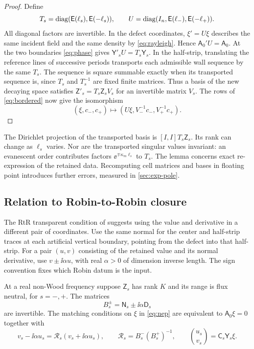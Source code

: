 \begin{proof}
Define
\[
 T_s=\operatorname{diag}(\mathsf E(\ell_s),\mathsf E(-\ell_s)),\qquad
 U=\operatorname{diag}(I_n,\mathsf E(\ell_-),\mathsf E(-\ell_+)).
\]
All diagonal factors are invertible. In the defect coordinates,
$\xi'=U\xi$ describes the same incident field and the same density by
\eqref{eq:rayleigh}. Hence $\mathsf A_0'U=\mathsf A_0$. At the two
boundaries \eqref{eq:phase} gives $\mathsf Y'_sU=T_s\mathsf Y_s$.
In the half-strip, translating the reference lines of successive periods
transports each admissible wall sequence by the same $T_s$. The sequence
is square summable exactly when its transported sequence is, since $T_s$
and $T_s^{-1}$ are fixed finite matrices. Thus a basis of the new
decaying space satisfies $\mathsf Z'_s=T_s\mathsf Z_sV_s$ for an invertible
matrix $V_s$. The rows of \eqref{eq:bordered} now give the isomorphism
\[
 (\xi,c_-,c_+)\longmapsto(U\xi,V_-^{-1}c_-,V_+^{-1}c_+).
\]
\end{proof}

The Dirichlet projection of the transported basis is $[I,I]T_s\mathsf Z_s$.
Its rank can change as $\ell_s$ varies. Nor are the transported singular
values invariant: an evanescent order contributes factors
$\ee^{\mp\kappa_m\ell_s}$ to $T_s$. The lemma concerns exact re-expression
of the retained data. Recomputing cell matrices and bases in floating
point introduces further errors, measured in \cref{sec:exp-pole}.

\subsection{Relation to Robin-to-Robin closure}\label{sec:robin}
The RtR transparent condition of \cite[Thm.~4.1]{FlissKlindworthSchmidt2015}
suggests using the value and derivative in a different pair of coordinates.
Use the same normal for the center and half-strip traces at each
artificial vertical boundary, pointing from the defect into that
half-strip. For a pair $(u,v)$ consisting of the retained value and its
normal derivative, use $v\pm\ii\alpha u$, with real $\alpha>0$ of dimension
inverse length. The sign convention fixes which Robin datum is the input.

\begin{corollary}\label{cor:robin}
At a real non-Wood frequency suppose $\mathsf Z_s$ has rank $K$ and its
range is flux neutral, for $s=-,+$. The matrices
\[
 B_s^\pm=\mathsf N_s\pm\ii\alpha\mathsf D_s
\]
are invertible. The matching conditions on $\xi$ in \eqref{eq:nep} are
equivalent to $\mathsf A_0\xi=0$ together with
\begin{equation}\label{eq:robin-match}
 v_s-\ii\alpha u_s=\mathcal R_s(v_s+\ii\alpha u_s),\qquad
 \mathcal R_s=B_s^-(B_s^+)^{-1},\qquad
 \binom{u_s}{v_s}=\mathsf C_s\mathsf Y_s\xi .
\end{equation}
\end{corollary}

